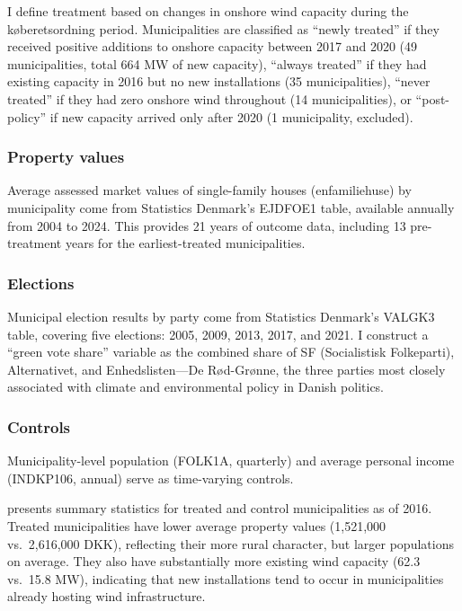 \documentclass[12pt]{article}
\begin{document}
I define treatment based on changes in onshore wind capacity during the k{\o}beretsordning period. Municipalities are classified as ``newly treated'' if they received positive additions to onshore capacity between 2017 and 2020 (49 municipalities, total 664 MW of new capacity), ``always treated'' if they had existing capacity in 2016 but no new installations (35 municipalities), ``never treated'' if they had zero onshore wind throughout (14 municipalities), or ``post-policy'' if new capacity arrived only after 2020 (1 municipality, excluded).

\subsubsection*{Property values} Average assessed market values of single-family houses (enfamiliehuse) by municipality come from Statistics Denmark's EJDFOE1 table, available annually from 2004 to 2024. This provides 21 years of outcome data, including 13 pre-treatment years for the earliest-treated municipalities.

\subsubsection*{Elections} Municipal election results by party come from Statistics Denmark's VALGK3 table, covering five elections: 2005, 2009, 2013, 2017, and 2021. I construct a ``green vote share'' variable as the combined share of SF (Socialistisk Folkeparti), Alternativet, and Enhedslisten---De R{\o}d-Gr{\o}nne, the three parties most closely associated with climate and environmental policy in Danish politics.

\subsubsection*{Controls} Municipality-level population (FOLK1A, quarterly) and average personal income (INDKP106, annual) serve as time-varying controls.

 presents summary statistics for treated and control municipalities as of 2016. Treated municipalities have lower average property values (1,521,000 vs.\ 2,616,000 DKK), reflecting their more rural character, but larger populations on average. They also have substantially more existing wind capacity (62.3 vs.\ 15.8 MW), indicating that new installations tend to occur in municipalities already hosting wind infrastructure.


\end{document}
